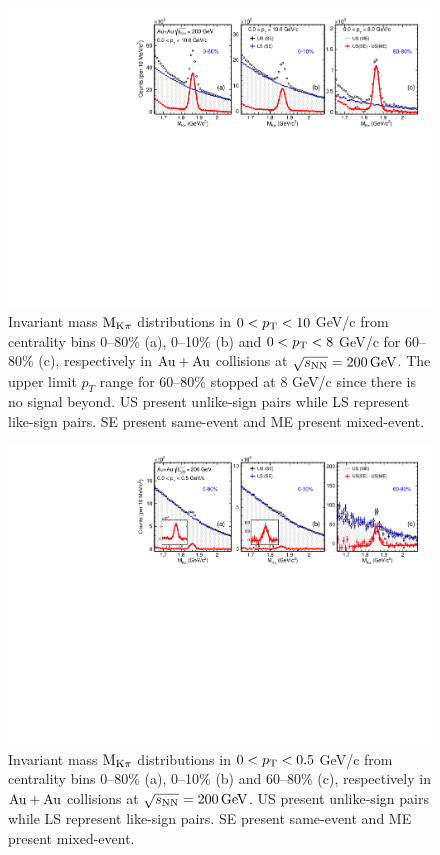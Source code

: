 \documentclass[%
 reprint,	
 amsmath,amssymb,
 aps,
 prc,
]{revtex4-1}
\begin{document}
\begin{figure}
\centering
\includegraphics[width=1.0\textwidth]{fig/signal_0_8_10GeV.pdf}
\caption{Invariant mass $\rm M_{K\pi}$ distributions in $0 < p_{\rm T} < 10$ GeV/c from centrality bins 0--80\% (a), 0--10\% (b) and $0 < p_{\rm T} < 8$ GeV/c for 60--80\% (c), respectively in ${\rm{Au + Au}}$ collisions at ${\sqrt{s_{\rm NN}} = \rm{200\,GeV}}$. The upper limit $p_T$ range for 60--80\% stopped at 8 GeV/c since there is no signal beyond. US present unlike-sign pairs while LS represent like-sign pairs. SE present same-event and ME present mixed-event.}
\label{fig:signal_0} 
\end{figure}

\begin{figure}
\centering
\includegraphics[width=1.0\textwidth]{fig/signal2_0_05GeV.pdf}
\caption{Invariant mass $\rm M_{K\pi}$ distributions in $0 < p_{\rm T} < 0.5$ GeV/c from centrality bins 0--80\% (a), 0--10\% (b) and 60--80\% (c), respectively in ${\rm{Au + Au}}$ collisions at ${\sqrt{s_{\rm NN}} = \rm{200\,GeV}}$. US present unlike-sign pairs while LS represent like-sign pairs. SE present same-event and ME present mixed-event.}
\label{fig:signal_1} 
\end{figure}
\end{document}
